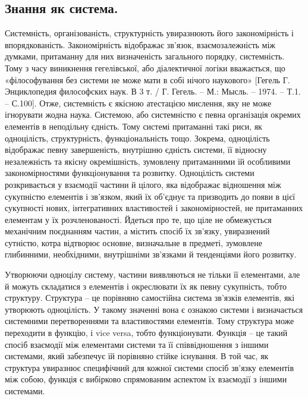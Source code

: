 \subsection{Знання як система.} Системність, організованість, структурність
увиразнюють його закономірність і впорядкованість. Закономірність
відображає зв’язок, взаємозалежність між думками, притаманну для них
визначеність загального порядку, системність. Тому з часу виникнення
гегелівської, або діалектичної логіки вважається, що «філософування без
системи не може мати в собі нічого наукового» [Гегель Г. Энциклопедия
философских наук. В 3 т. / Г. Гегель. – М.: Мысль. – 1974. – Т.1. – С.100]. Отже,
системність є якісною атестацією мислення, яку не може ігнорувати жодна
наука. Системою, або системністю є певна організація окремих елементів в
неподільну єдність. Тому системі притаманні такі риси, як одноцілість,
структурність, функціональність тощо. Зокрема, одноцілість відображає певну
завершеність, внутрішню єдність системи, її відносну незалежність та якісну
окремішність, зумовлену притаманними їй особливими закономірностями
функціонування та розвитку. Одноцілість системи розкривається у взаємодії
частини й цілого, яка відображає відношення між сукупністю елементів і 
зв’язком, який їх об’єднує та призводить до появи в цієї сукупності нових,
інтегративних властивостей і закономірностей, не притаманних елементам у їх
розчленованості. Йдеться про те, що ціле не обмежується механічним
поєднанням частин, а містить спосіб їх зв’язку, увиразнений сутністю, котра
відтворює основне, визначальне в предметі, зумовлене глибинними,
необхідними, внутрішніми зв’язками й тенденціями його розвитку.

Утворюючи одноцілу систему, частини виявляються не тільки її
елементами, але й можуть складатися з елементів і окреслювати їх як певну
сукупність, тобто структуру. Структура – це порівняно самостійна система
зв’язків елементів, які утворюють одноцілість. У такому значенні вона є
ознакою системи і визначається системними перетвореннями та властивостями
елементів. Тому структура може переходити в функцію, і vice versa, тобто
функціонувати. Функція – це такий спосіб взаємодії між елементами системи та
її співвідношення з іншими системами, який забезпечує їй порівняно стійке
існування. В той час, як структура увиразнює специфічний для кожної системи
спосіб зв’язку елементів між собою, функція є вибірково спрямованим
аспектом їх взаємодії з іншими системами.

